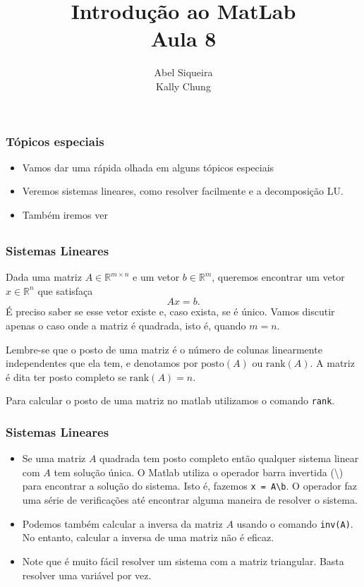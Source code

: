 \documentclass{beamer}
\title{Introdu\c{c}\~ao ao MatLab \\ Aula 8}
\author{Abel Siqueira \\ Kally Chung}
\date{}
\newcommand{\rank}{\mbox{rank}}
\begin{document}
\frame{\titlepage}

\section[T\'opicos especiais]{}

\begin{frame}[fragile]
\frametitle{T\'opicos especiais}

\begin{itemize}
\item<1-> Vamos dar uma r\'apida olhada em alguns t\'opicos especiais
\item<2-> Veremos sistemas lineares, como resolver facilmente e a
decomposi\c{c}\~ao LU.
\item<3-> Tamb\'em iremos ver 
\end{itemize}

\end{frame}

\subsection[Sistemas Lineares]{}

\begin{frame}[fragile]
\frametitle{Sistemas Lineares}

Dada uma matriz $A \in \mathbb{R}^{m\times n}$ e um vetor $b \in \mathbb{R}^m$,
queremos encontrar um vetor $x \in \mathbb{R}^n$ que satisfa\c{c}a
$$Ax = b.$$
\pause
\'E preciso saber se esse vetor existe e, caso exista, se \'e \'unico. Vamos
discutir apenas o caso onde a matriz \'e quadrada, isto \'e, quando $m=n$.
\pause

Lembre-se que o posto de uma matriz \'e o n\'umero de colunas linearmente
independentes que ela tem, e denotamos por $\mbox{posto}(A)$ ou
$\mbox{rank}(A)$. A matriz \'e dita ter posto completo se $\rank(A) = n$.
\pause

Para calcular o posto de uma matriz no matlab utilizamos o comando {\tt rank}.
\end{frame}

\begin{frame}[fragile]
\frametitle{Sistemas Lineares}

\begin{itemize}
 \item<1-> Se uma matriz $A$ quadrada tem posto completo ent\~ao qualquer
sistema linear com $A$ tem solu\c{c}\~ao \'unica. O Matlab utiliza o operador
barra invertida (\textbackslash) para encontrar a solu\c{c}\~ao do sistema. Isto
\'e, fazemos \verb+x = A\b+. O operador faz uma s\'erie de verifica\c{c}\~oes
at\'e encontrar alguma maneira de resolver o sistema.

\item<2-> Podemos tamb\'em calcular a inversa da matriz $A$ usando o comando
{\tt inv(A)}. No entanto, calcular a inversa de uma matriz n\~ao \'e eficaz.

\item<3-> Note que \'e muito f\'acil resolver um sistema com a matriz
triangular. Basta resolver uma vari\'avel por vez.
\end{itemize}

\end{frame}
\end{document}

